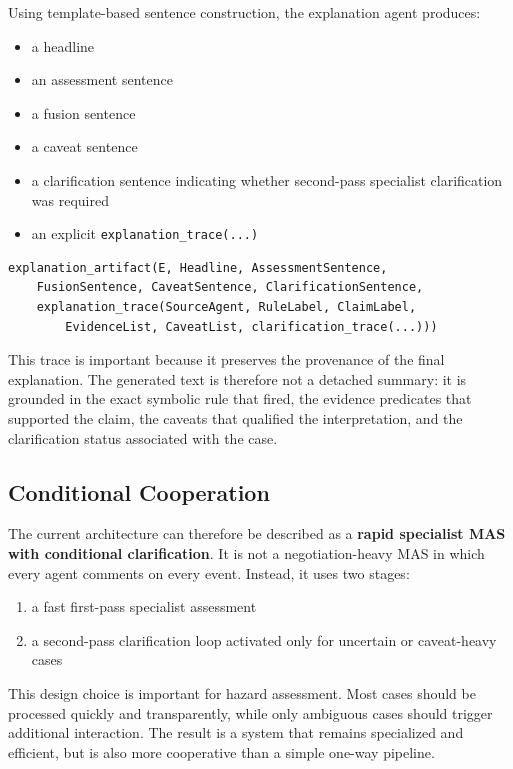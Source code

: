 \documentclass[11pt,a4paper]{article}
\begin{document}
Using template-based sentence construction, the explanation agent produces:

\begin{itemize}
\item a headline
\item an assessment sentence
\item a fusion sentence
\item a caveat sentence
\item a clarification sentence indicating whether second-pass specialist clarification was required
\item an explicit \texttt{explanation\_trace(...)}
\end{itemize}

\begin{lstlisting}
explanation_artifact(E, Headline, AssessmentSentence,
    FusionSentence, CaveatSentence, ClarificationSentence,
    explanation_trace(SourceAgent, RuleLabel, ClaimLabel,
        EvidenceList, CaveatList, clarification_trace(...)))
\end{lstlisting}

This trace is important because it preserves the provenance of the final explanation. The generated text is therefore not a detached summary: it is grounded in the exact symbolic rule that fired, the evidence predicates that supported the claim, the caveats that qualified the interpretation, and the clarification status associated with the case.

\subsection{Conditional Cooperation}

The current architecture can therefore be described as a \textbf{rapid specialist MAS with conditional clarification}. It is not a negotiation-heavy MAS in which every agent comments on every event. Instead, it uses two stages:

\begin{enumerate}
\item a fast first-pass specialist assessment
\item a second-pass clarification loop activated only for uncertain or caveat-heavy cases
\end{enumerate}

This design choice is important for hazard assessment. Most cases should be processed quickly and transparently, while only ambiguous cases should trigger additional interaction. The result is a system that remains specialized and efficient, but is also more cooperative than a simple one-way pipeline.
\end{document}
